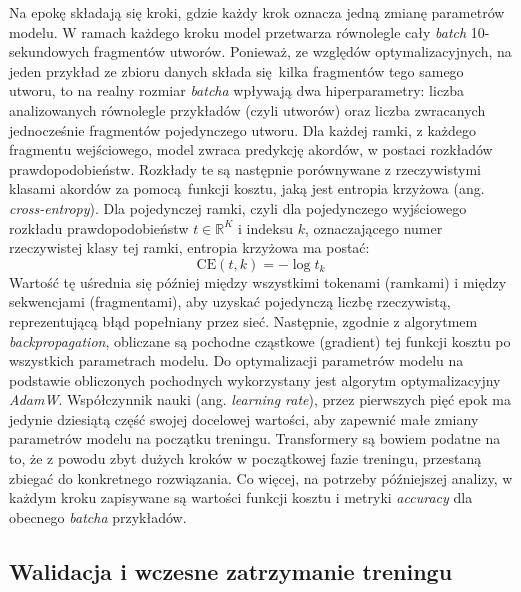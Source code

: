 Na epokę składają się kroki, gdzie każdy krok oznacza jedną zmianę parametrów modelu. W ramach każdego kroku model przetwarza równolegle cały \emph{batch} 10-sekundowych fragmentów utworów.  Ponieważ, ze względów optymalizacyjnych, na jeden przykład ze zbioru danych składa się kilka fragmentów tego samego utworu, to na realny rozmiar \emph{batcha} wpływają dwa hiperparametry: liczba analizowanych równolegle przykładów (czyli utworów) oraz liczba zwracanych jednocześnie fragmentów pojedynczego utworu. Dla każdej ramki, z każdego fragmentu wejściowego, model zwraca predykcję akordów, w postaci rozkładów prawdopodobieństw. Rozkłady te są następnie porównywane z rzeczywistymi klasami akordów za pomocą funkcji kosztu, jaką jest entropia krzyżowa (ang. \emph{cross-entropy}). Dla pojedynczej ramki, czyli dla pojedynczego wyjściowego rozkładu prawdopodobieństw $t \in \mathbb{R}^K$ i indeksu $k$, oznaczającego numer rzeczywistej klasy tej ramki, entropia krzyżowa ma postać:
\begin{equation}
    \textrm{CE}(t, k) = - \log t_k
\end{equation}
Wartość tę uśrednia się później między wszystkimi tokenami (ramkami) i między sekwencjami (fragmentami), aby uzyskać pojedynczą liczbę rzeczywistą, reprezentującą błąd popełniany przez sieć.  Następnie, zgodnie z algorytmem \emph{backpropagation}, obliczane są pochodne cząstkowe (gradient) tej funkcji kosztu po wszystkich parametrach modelu. Do optymalizacji parametrów modelu na podstawie obliczonych pochodnych wykorzystany jest algorytm optymalizacyjny \emph{AdamW}. Współczynnik nauki (ang. \emph{learning rate}), przez pierwszych pięć epok ma jedynie dziesiątą część swojej docelowej wartości, aby zapewnić małe zmiany parametrów modelu na początku treningu. Transformery są bowiem podatne na to, że z powodu zbyt dużych kroków w początkowej fazie treningu, przestaną zbiegać do konkretnego rozwiązania. Co więcej, na potrzeby późniejszej analizy, w każdym kroku zapisywane są wartości funkcji kosztu i metryki \emph{accuracy} dla obecnego \emph{batcha} przykładów.

\subsection{Walidacja i wczesne zatrzymanie treningu}

